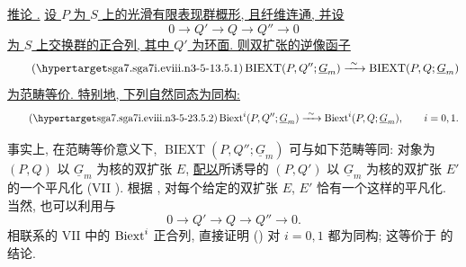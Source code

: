

\medskip
\noindent\underline{推论 .} \underline{设 $P$ 为 $S$ 上的光滑有限表现群概形, 且纤维连通, 并设}
\[
 0\longrightarrow Q'\longrightarrow Q\longrightarrow Q''
 \longrightarrow0
\]
\underline{为 $S$ 上交换群的正合列, 其中 $Q'$ 为环面. 则双扩张的逆像函子}
\begin{equation}\tag{\SGARefTarget{sga7.sga7i.eviii.n3-5-1}{3.5.1}}
 \operatorname{BIEXT}(P,Q'';\underline G_m)
 \xrightarrow{\ \sim\ }
 \operatorname{BIEXT}(P,Q;\underline G_m)
\end{equation}
\underline{为范畴等价. 特别地, 下列自然同态为同构:}
\begin{equation}\tag{\SGARefTarget{sga7.sga7i.eviii.n3-5-2}{3.5.2}}
 \Biext^i(P,Q'';\underline G_m)
 \xrightarrow{\ \sim\ }
 \Biext^i(P,Q;\underline G_m),
 \qquad i=0,1.
\end{equation}

事实上, 在范畴等价意义下, $\operatorname{BIEXT}(P,Q'';\underline
G_m)$ 可与如下范畴等同: 对象为 $(P,Q)$ 以 $\underline G_m$ 为核的双扩张 $E$, \underline{配以}所诱导的 $(P,Q')$ 以 $\underline G_m$ 为核的双扩张 $E'$ 的一个平凡化 (VII ). 根据 , 对每个给定的双扩张 $E$, $E'$ 恰有一个这样的平凡化. 当然, 也可以利用与
\[
 0\longrightarrow Q'\longrightarrow Q\longrightarrow Q''
 \longrightarrow0.
\]
相联系的 VII  中的 $\operatorname{Biext}^i$ 正合列, 直接证明 () 对 $i=0,1$ 都为同构; 这等价于  的结论.

